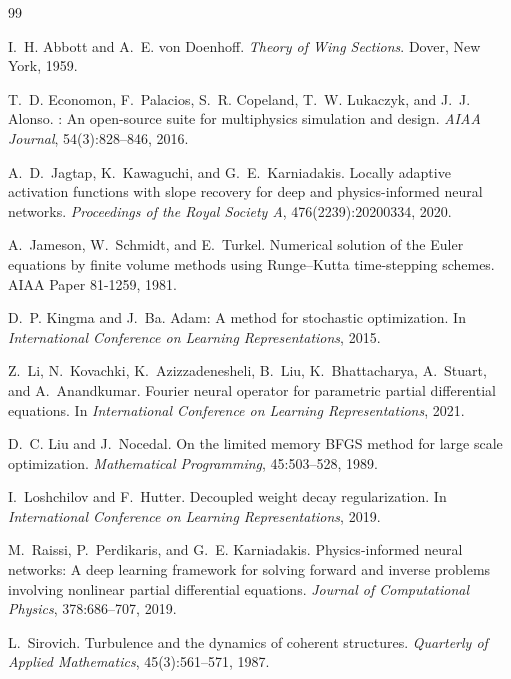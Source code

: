 \documentclass[11pt]{article}
\begin{document}
\begin{thebibliography}{99}
\small

I.~H. Abbott and A.~E. von Doenhoff.
\newblock \emph{Theory of Wing Sections}.
\newblock Dover, New York, 1959.

T.~D. Economon, F.~Palacios, S.~R. Copeland, T.~W. Lukaczyk, and J.~J. Alonso.
: An open-source suite for multiphysics simulation and design.
\newblock \emph{AIAA Journal}, 54(3):828--846, 2016.

A.~D.~Jagtap, K.~Kawaguchi, and G.~E.~Karniadakis.
\newblock Locally adaptive activation functions with slope recovery for deep and
  physics-informed neural networks.
\newblock \emph{Proceedings of the Royal Society A}, 476(2239):20200334, 2020.

A.~Jameson, W.~Schmidt, and E.~Turkel.
\newblock Numerical solution of the {Euler} equations by finite volume methods using
  {Runge--Kutta} time-stepping schemes.
\newblock AIAA Paper 81-1259, 1981.

D.~P. Kingma and J.~Ba.
\newblock Adam: A method for stochastic optimization.
\newblock In \emph{International Conference on Learning Representations}, 2015.

Z.~Li, N.~Kovachki, K.~Azizzadenesheli, B.~Liu, K.~Bhattacharya, A.~Stuart, and A.~Anandkumar.
\newblock Fourier neural operator for parametric partial differential equations.
\newblock In \emph{International Conference on Learning Representations}, 2021.

D.~C. Liu and J.~Nocedal.
\newblock On the limited memory {BFGS} method for large scale optimization.
\newblock \emph{Mathematical Programming}, 45:503--528, 1989.

I.~Loshchilov and F.~Hutter.
\newblock Decoupled weight decay regularization.
\newblock In \emph{International Conference on Learning Representations}, 2019.

M.~Raissi, P.~Perdikaris, and G.~E. Karniadakis.
\newblock Physics-informed neural networks: A deep learning framework for solving forward and
  inverse problems involving nonlinear partial differential equations.
\newblock \emph{Journal of Computational Physics}, 378:686--707, 2019.

L.~Sirovich.
\newblock Turbulence and the dynamics of coherent structures.
\newblock \emph{Quarterly of Applied Mathematics}, 45(3):561--571, 1987.


\end{thebibliography}
\end{document}
